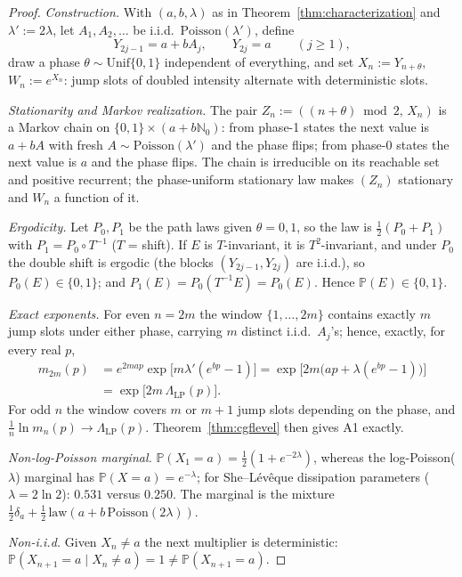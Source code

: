 \documentclass[pdflatex,sn-mathphys-num]{sn-jnl}
\theoremstyle{thmstyleone}
\theoremstyle{thmstyletwo}
\theoremstyle{thmstylethree}
\begin{document}
\begin{proof}
\textit{Construction.}  With $(a, b, \lambda)$ as in
Theorem~\ref{thm:characterization} and $\lambda' := 2\lambda$, let
$A_1, A_2, \ldots$ be i.i.d.\ $\mathrm{Poisson}(\lambda')$, define
\[
  Y_{2j-1} = a + bA_j, \qquad Y_{2j} = a \qquad (j \ge 1),
\]
draw a phase $\theta \sim \mathrm{Unif}\{0,1\}$ independent of
everything, and set $X_n := Y_{n+\theta}$, $W_n := e^{X_n}$: jump
slots of doubled intensity alternate with deterministic slots.

\textit{Stationarity and Markov realization.}  The pair $Z_n :=
((n+\theta)\bmod 2,\, X_n)$ is a Markov chain on
$\{0,1\}\times(a+b\mathbb{N}_0)$: from phase-1 states the next value
is $a + bA$ with fresh $A \sim \mathrm{Poisson}(\lambda')$ and the
phase flips; from phase-0 states the next value is $a$ and the phase
flips.  The chain is irreducible on its reachable set and positive
recurrent; the phase-uniform stationary law makes $(Z_n)$
stationary and $W_n$ a function of it.

\textit{Ergodicity.}  Let $P_0, P_1$ be the path laws given $\theta
= 0,1$, so the law is $\tfrac12(P_0+P_1)$ with $P_1 = P_0\circ
T^{-1}$ ($T$ = shift).  If $E$ is $T$-invariant, it is
$T^2$-invariant, and under $P_0$ the double shift is ergodic (the
blocks $(Y_{2j-1}, Y_{2j})$ are i.i.d.), so $P_0(E) \in \{0,1\}$;
and $P_1(E) = P_0(T^{-1}E) = P_0(E)$.  Hence $\mathbb{P}(E) \in
\{0,1\}$.

\textit{Exact exponents.}  For even $n = 2m$ the window
$\{1,\ldots,2m\}$ contains exactly $m$ jump slots under either
phase, carrying $m$ distinct i.i.d.\ $A_j$'s; hence, exactly, for
every real $p$,
\[
\begin{aligned}
  m_{2m}(p)
  &= e^{2map}\exp\bigl[m\lambda'(e^{bp}-1)\bigr]
  = \exp\bigl[2m\bigl(ap + \lambda(e^{bp}-1)\bigr)\bigr]\\
  &= \exp\bigl[2m\,\Lambda_{\mathrm{LP}}(p)\bigr].
\end{aligned}
\]
For odd $n$ the window covers $m$ or $m+1$ jump slots depending on
the phase, and $\tfrac1n\ln m_n(p) \to \Lambda_{\mathrm{LP}}(p)$.
Theorem~\ref{thm:cgflevel} then gives A1 exactly.

\textit{Non-log-Poisson marginal.}  $\mathbb{P}(X_1 = a) =
\tfrac12(1 + e^{-2\lambda})$, whereas the log-Poisson($\lambda$)
marginal has $\mathbb{P}(X = a) = e^{-\lambda}$; for She--L\'ev\^eque
dissipation parameters ($\lambda = 2\ln2$): $0.531$ versus $0.250$.
The marginal is the mixture $\tfrac12\delta_a +
\tfrac12\,\mathrm{law}(a + b\,\mathrm{Poisson}(2\lambda))$.

\textit{Non-i.i.d.}  Given $X_n \ne a$ the next multiplier is
deterministic: $\mathbb{P}(X_{n+1} = a \mid X_n \ne a) = 1 \ne
\mathbb{P}(X_{n+1} = a)$.
\end{proof}
\end{document}
